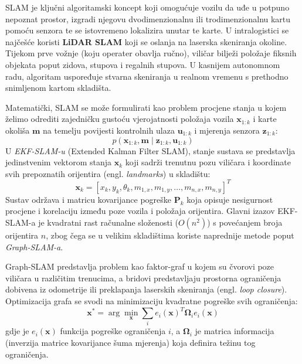 SLAM je ključni algoritamski koncept koji omogućuje vozilu da uđe u potpuno nepoznat prostor, izgradi njegovu dvodimenzionalnu ili trodimenzionalnu kartu pomoću senzora te se istovremeno lokalizira unutar te karte. U intralogistici se najčešće koristi \textbf{LiDAR SLAM} koji se oslanja na laserska skeniranja okoline. Tijekom prve vožnje (koju operater obavlja ručno), viličar bilježi položaje fiksnih objekata poput zidova, stupova i regalnih stupova. U kasnijem autonomnom radu, algoritam uspoređuje stvarna skeniranja u realnom vremenu s prethodno snimljenom kartom skladišta.

Matematički, SLAM se može formulirati kao problem procjene stanja u kojem želimo odrediti zajedničku gustoću vjerojatnosti položaja vozila $\mathbf{x}_{1:k}$ i karte okoliša $\mathbf{m}$ na temelju povijesti kontrolnih ulaza $\mathbf{u}_{1:k}$ i mjerenja senzora $\mathbf{z}_{1:k}$:
\begin{equation}
    p(\mathbf{x}_{1:k}, \mathbf{m} \mid \mathbf{z}_{1:k}, \mathbf{u}_{1:k})
\end{equation}
U \textit{EKF-SLAM-u \cite{slam}} (Extended Kalman Filter SLAM), stanje sustava se predstavlja jedinstvenim vektorom stanja $\mathbf{x}_k$ koji sadrži trenutnu pozu viličara i koordinate svih prepoznatih orijentira (engl. \textit{landmarks}) u skladištu:
\begin{equation}
    \mathbf{x}_k = [x_k, y_k, \theta_k, m_{1,x}, m_{1,y}, \dots, m_{n,x}, m_{n,y}]^T
\end{equation}
Sustav održava i matricu kovarijance pogreške $\mathbf{P}_k$ koja opisuje nesigurnost procjene i korelaciju između poze vozila i položaja orijentira. Glavni izazov EKF-SLAM-a je kvadratni rast računalne složenosti ($O(n^2)$) s povećanjem broja orijentira $n$, zbog čega se u velikim skladištima koriste naprednije metode poput \textit{Graph-SLAM-a}.

Graph-SLAM predstavlja problem kao faktor-graf u kojem su čvorovi poze viličara u različitim trenucima, a bridovi predstavljaju prostorna ograničenja dobivena iz odometrije ili preklapanja laserskih skeniranja (engl. \textit{loop closure}). Optimizacija grafa se svodi na minimizaciju kvadratne pogreške svih ograničenja:
\begin{equation}
    \mathbf{x}^* = \arg\min_{\mathbf{x}} \sum_{i} e_i(\mathbf{x})^T \mathbf{\Omega}_i e_i(\mathbf{x})
\end{equation}
gdje je $e_i(\mathbf{x})$ funkcija pogreške ograničenja $i$, a $\mathbf{\Omega}_i$ je matrica informacija (inverzija matrice kovarijance šuma mjerenja) koja definira težinu tog ograničenja.

